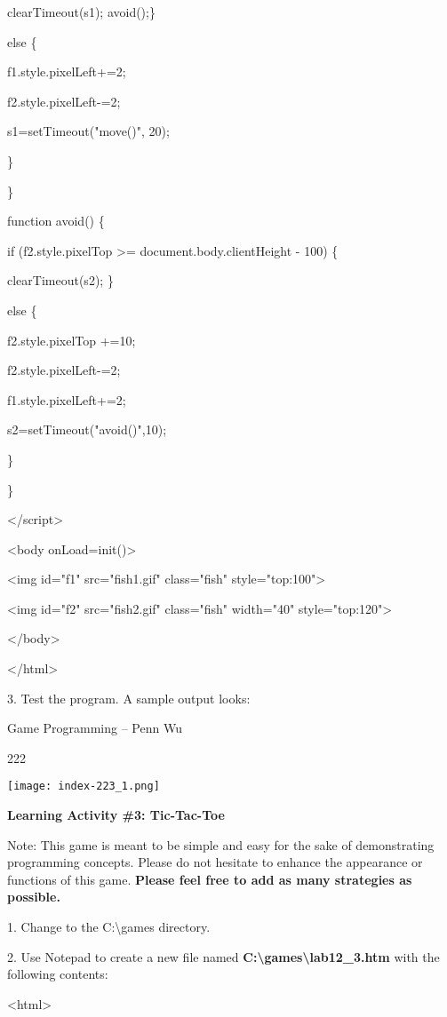 \documentclass[
]{article}
\begin{document}
clearTimeout(s1); avoid();\}

else \{

f1.style.pixelLeft+=2;

f2.style.pixelLeft-=2;

s1=setTimeout("move()", 20);

\}

\}

function avoid() \{

if (f2.style.pixelTop \textgreater= document.body.clientHeight - 100) \{

clearTimeout(s2); \}

else \{

f2.style.pixelTop +=10;

f2.style.pixelLeft-=2;

f1.style.pixelLeft+=2;

s2=setTimeout("avoid()",10);

\}

\}

\textless/script\textgreater{}

\textless body onLoad=init()\textgreater{}

\textless img id="f1" src="fish1.gif" class="fish"
style="top:100"\textgreater{}

\textless img id="f2" src="fish2.gif" class="fish" width="40"
style="top:120"\textgreater{}

\textless/body\textgreater{}

\textless/html\textgreater{}

3. Test the program. A sample output looks:

Game Programming -- Penn Wu

222

\protect\hypertarget{index_split_011.htmlux5cux23p223}{}{}\texttt{[image: index-223\_1.png]}

\textbf{Learning Activity \#3: Tic-Tac-Toe}

Note: This game is meant to be simple and easy for the sake of
demonstrating programming concepts. Please do not hesitate to enhance
the appearance or functions of this game. \textbf{Please feel free to
add as many strategies as} \textbf{possible.}

1. Change to the C:\textbackslash games directory.

2. Use Notepad to create a new file named
\textbf{C:\textbackslash games\textbackslash lab12\_3.htm} with the
following contents:

\textless html\textgreater{}
\end{document}
